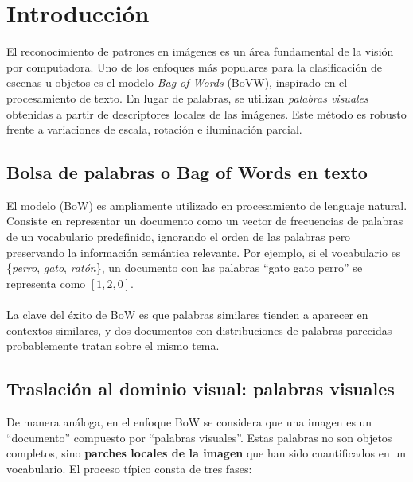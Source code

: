 \documentclass{article}
\begin{document}
\section{Introducción}



El reconocimiento de patrones en imágenes es un área fundamental de la visión por computadora. Uno de los enfoques más populares para la clasificación de escenas u objetos es el modelo \textit{Bag of Words} (BoVW), inspirado en el procesamiento de texto. En lugar de palabras, se utilizan \textit{palabras visuales} obtenidas a partir de descriptores locales de las imágenes. Este método es robusto frente a variaciones de escala, rotación e iluminación parcial.
\subsection{Bolsa de palabras o Bag of Words en texto}
El modelo (BoW) es ampliamente utilizado en procesamiento de lenguaje natural. Consiste en representar un documento como un vector de frecuencias de palabras de un vocabulario predefinido, ignorando el orden de las palabras pero preservando la información semántica relevante. Por ejemplo, si el vocabulario es \{\textit{perro}, \textit{gato}, \textit{ratón}\}, un documento con las palabras “gato gato perro” se representa como $[1,2,0]$.
\\\\
La clave del éxito de BoW es que palabras similares tienden a aparecer en contextos similares, y dos documentos con distribuciones de palabras parecidas probablemente tratan sobre el mismo tema.

\subsection{Traslación al dominio visual: palabras visuales}
De manera análoga, en el enfoque BoW se considera que una imagen es un “documento” compuesto por “palabras visuales”. Estas palabras no son objetos completos, sino \textbf{parches locales de la imagen} que han sido cuantificados en un vocabulario. El proceso típico consta de tres fases:
\end{document}
